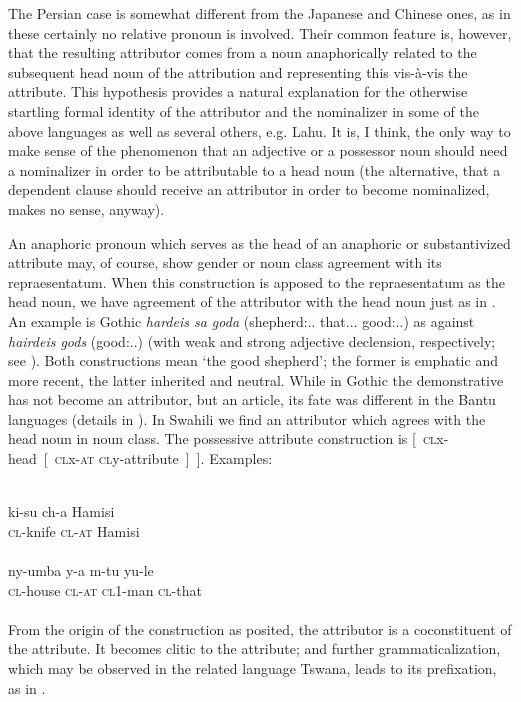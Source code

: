 The Persian case is somewhat different from the Japanese and Chinese ones, as in these certainly no relative pronoun is involved. Their common feature is, however, that the resulting attributor comes from a noun anaphorically related to the subsequent head noun of the attribution and representing this vis-à-vis the attribute. This hypothesis provides a natural explanation for the otherwise startling formal identity of the attributor and the nominalizer in some of the above languages as well as several others, e.g. Lahu. It is, I think, the only way to make sense of the phenomenon that an adjective or a possessor noun should need a nominalizer in order to be attributable to a head noun (the alternative, that a dependent clause should receive an attributor in order to become nominalized, makes no sense, anyway).

An anaphoric pronoun which serves as the head of an anaphoric or substantivized attribute may, of course, show gender or noun class agreement with its repraesentatum. When this construction is apposed to the repraesentatum as the head noun, we have agreement of the attributor with the head noun just as in . An example is Gothic \textit{hardeis sa goda} (shepherd:\textsc{\glnom.\glsg.\glm} that.\textsc{\glnom.\glsg.\glm} good:\textsc{\glnom.\glsg.\glm}) as against \textit{hairdeis gods} (good:\textsc{\glnom.\glsg.\glm}) (with weak and strong adjective declension, respectively; see \citealt[110]{Ramat1980}). Both constructions mean ‘the good shepherd’; the former is emphatic and more recent, the latter inherited and neutral. While in Gothic the demonstrative has not become an attributor, but an article, its fate was different in the Bantu languages (details in \citealt[§7.2]{Lehmann1982b}). In Swahili we find an attributor which agrees with the head noun in noun class. The possessive attribute construction is [~\textsc{cl}x-head~[~\textsc{cl}x-\textsc{at} \textsc{cl}y-attribute~]~]. Examples:

\ea\label{ex:E43}
 \\
 \ea
 \gll  ki-su  ch-a  Hamisi\\
  \textsc{cl}-knife  \textsc{cl}-\textsc{at}  Hamisi\\
\\
\ex
\gll  ny-umba  y-a  m-tu  yu-le\\
\textsc{cl}-house  \textsc{cl}-\textsc{at}  \textsc{cl}1-man  \textsc{cl}-that\\
\\
\z
\z 
\noindent From the origin of the construction as posited, the attributor is a coconstituent of the attribute. It becomes clitic to the attribute; and further grammaticalization, which may be observed in the related language Tswana, leads to its prefixation, as in .

